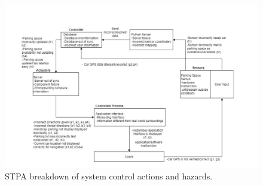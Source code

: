 \documentclass[]{article}
\begin{document}
\begin{figure}[H]
	\centering
	\includegraphics[width=\textwidth,height=\textheight,keepaspectratio]{images/stpa}
	\caption{STPA breakdown of system control actions and hazards.}
	\label{fig:fdd}
\end{figure}
\end{document}
